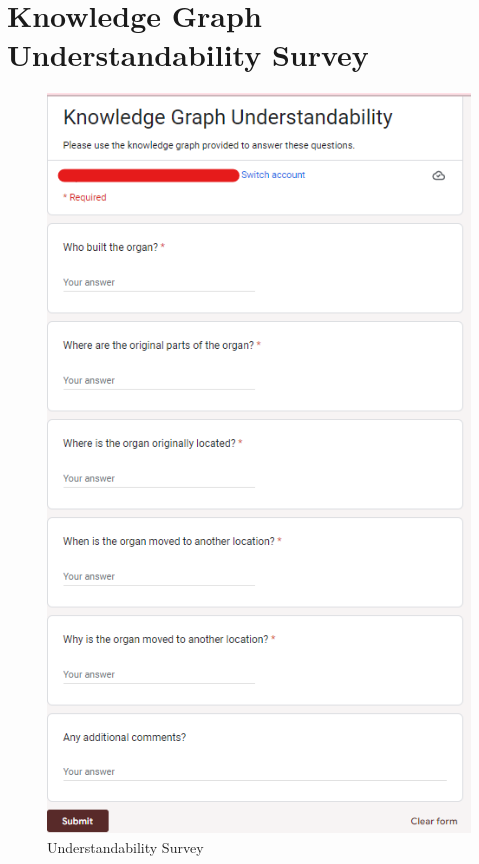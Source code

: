 \section{Knowledge Graph Understandability Survey}
\begin{figure}[H]
\begin{center}
    \includegraphics{Images/KGSurvey.png}
\end{center}
\vspace{-0.4cm}
\caption{Understandability Survey}
\end{figure}

